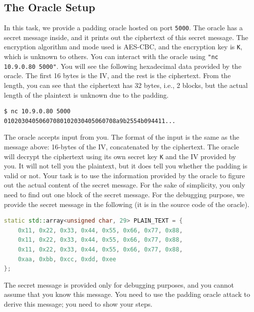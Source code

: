 \subsection{The Oracle Setup} 

In this task, we provide a padding oracle hosted on port \texttt{5000}.
The oracle has a secret message inside, and it 
prints out the ciphertext of this secret message. The encryption algorithm
and mode used is AES-CBC, and the encryption key is \texttt{K}, which
is unknown to others.
You can interact with the oracle using \texttt{"nc 10.9.0.80 5000"}.
You will see the following hexadecimal data provided by the oracle. 
The first 16 bytes is the IV, and the rest is the ciphertext. 
From the length, you can see that the ciphertext has 32 bytes, i.e.,
2 blocks, but the actual length of the plaintext is unknown
due to the padding. 

\begin{lstlisting}
$ nc 10.9.0.80 5000
01020304050607080102030405060708a9b2554b094411...
\end{lstlisting}

The oracle accepts input from you. The format of the input 
is the same as the message above: 16-bytes of the IV, concatenated
by the ciphertext. The oracle will decrypt the ciphertext using 
its own secret key \texttt{K}  and the IV provided by you.
It will not tell you the plaintext, but
it does tell you whether the padding is valid or not. 
Your task is to use the information provided by the oracle
to figure out the actual content of the secret message. 
For the sake of simplicity, you only need to find out one block
of the secret message. For the debugging purpose,
we provide the secret message in the following (it is 
in the source code of the oracle).

\begin{lstlisting}[language=c++]
static std::array<unsigned char, 29> PLAIN_TEXT = {
    0x11, 0x22, 0x33, 0x44, 0x55, 0x66, 0x77, 0x88,
    0x11, 0x22, 0x33, 0x44, 0x55, 0x66, 0x77, 0x88,
    0x11, 0x22, 0x33, 0x44, 0x55, 0x66, 0x77, 0x88,
    0xaa, 0xbb, 0xcc, 0xdd, 0xee
};
\end{lstlisting}
 
The secret message is provided only for debugging purposes, and you cannot assume that 
you know this message.  You need to use the 
padding oracle attack to derive this message; you need to 
show your steps. 

